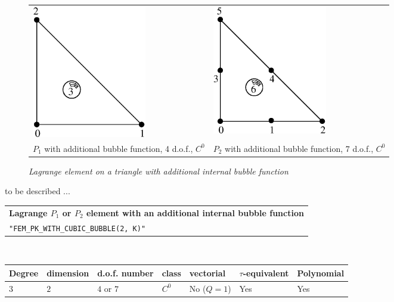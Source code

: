 \documentclass[11pt,a4paper]{article}
\begin{document}
\begin{figure}[H]
  \begin{center}
    \begin{tabular}{m{7cm}m{7cm}}
      \includegraphics[width=5cm,angle=0]{getfemlist_triangle_P1_bubble.eps} & \includegraphics[width=5cm,angle=0]{getfemlist_triangle_P2_bubble.eps}  \\
      $P_1$ with additional bubble function, 4 d.o.f., $C^0$ & $P_2$ with additional bubble function, 7 d.o.f., $C^0$
    \end{tabular}
  \end{center}
  \caption{ \it Lagrange element on a triangle with additional internal bubble function} 
  \label{fig:triangle_p1_bubble}
\end{figure}

to be described ...

\begin{center}
\begin{tabular}{|m{16.11cm}|} \hline 
{ \bf Lagrange $P_1$ or $P_2$ element with an additional internal bubble function}\\
{\tt "FEM\_PK\_WITH\_CUBIC\_BUBBLE(2, K)"} 
\end{tabular} \\ \vspace{-1pt} 
\begin{tabular}{|m{2cm}|m{2cm}|m{2.5cm}|m{1.2cm}|m{2cm}|m{2cm}|m{1.8cm}|} \hline 
Degree & dimension & d.o.f. number & class & vectorial & \mbox{$\tau$-equivalent} & Polynomial\\ \hline
$3$ & $2$ & $4$ or $7$ & $C^0$ & No \mbox{($Q = 1$)} & Yes & Yes\\ \hline
\end{tabular}
\end{center}
\end{document}
